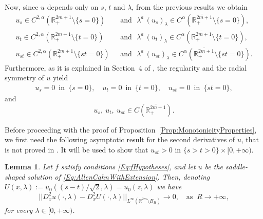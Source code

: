 \documentclass[12pt,reqno]{amsart}
\newtheorem{lemma}[theorem]{Lemma}
\theoremstyle{definition}
\theoremstyle{remark}
\newcommand{\con}[1]{\mathbb{#1}}
\newcommand{\R}{\con{R}} %
\numberwithin{equation}{section}
\begin{document}
Now, since $u$ depends only on $s$, $t$ and $\lambda$, from the previous results we obtain
\begin{align*}
u_s \in C^{2,\alpha}(\R_+^{2m+1}\setminus\{s=0\}) \,\, &\text{ and }\,\, \lambda^a\,(u_s)_\lambda \in C^{\alpha}(\overline{\R_+^{2m+1}}\setminus\{s=0\}),\\
u_t \in C^{2,\alpha}(\R_+^{2m+1}\setminus\{t=0\}) \,\, &\text{ and }\,\, \lambda^a\,(u_t)_\lambda \in C^{\alpha}(\overline{\R_+^{2m+1}}\setminus\{t=0\}),\\
u_{st} \in C^{2,\alpha}(\R_+^{2m+1}\setminus\{st=0\}) \,\, &\text{ and }\,\, \lambda^a\,(u_{st})_\lambda \in C^{\alpha}(\overline{\R_+^{2m+1}}\setminus\{st=0\}).
\end{align*}
Furthermore, as it is explained in Section~4 of \cite{Cabre-Saddle}, the regularity and the radial symmetry of $u$ yield
\begin{align*}
u_s=0 \,\text{ in } \, \{s=0\}, \quad 
u_t=0 \,\text{ in } \, \{t=0\},  \quad
u_{st}=0 \,\text{ in } \, \{st=0\},
\end{align*}
and
$$ u_s, \ u_t,\ u_{st} \in C(\overline{\R^{2m+1}_+}).  $$


Before proceeding with the proof of Proposition~\ref{Prop:MonotonicityProperties}, we first need the following asymptotic result for the second derivatives of $u$, that is not proved in \cite{Cinti-Saddle, Cinti-Saddle2}. It will be used to show that $u_{st}>0$ in $\{s>t>0\}\times [0,+\infty)$.

\begin{lemma}
Let $f$ satisfy conditions \eqref{Eq:fHypotheses}, and let $u$ be the saddle-shaped solution of \eqref{Eq:AllenCahnWithExtension}. Then, denoting $U(x,\lambda) := u_0((s - t)/\sqrt{2},\lambda) = u_0(z,\lambda)$ we have
$$ ||D^2_x u(\cdot,\lambda) - D^2_x U(\cdot,\lambda)||_{L^\infty(\R^{2m}\setminus B_R)} \to 0, \ \ \ \text{ as } \ R\to+\infty, $$
for every $\lambda \in [0,+\infty)$.
\end{lemma}
\end{document}
